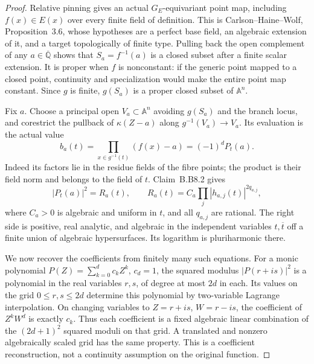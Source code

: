 \begin{proof}
Relative pinning gives an actual $G_E$-equivariant point map,
including $f(x)\in E(x)$ over every finite field of definition.
This is Carlson--Haine--Wolf, Proposition~3.6, whose hypotheses
are a perfect base field, an algebraic extension of it, and a
target topologically of finite type.  Pulling back the open
complement of any $a\in\overline{\mathbb Q}$ shows that
$S_a=f^{-1}(a)$ is a closed subset after a finite scalar extension.
It is proper when $f$ is nonconstant: if the generic point mapped
to a closed point, continuity and specialization would make the
entire point map constant.  Since $g$ is finite, $g(S_a)$ is a
proper closed subset of $\mathbb A^n$.

Fix $a$.  Choose a principal open $V_a\subset\mathbb A^n$
avoiding $g(S_a)$ and the branch locus, and corestrict the pullback
of $\kappa(Z-a)$ along
$g^{-1}(V_a)\to V_a$.  Its evaluation is the actual value
\[
 b_a(t)=\prod_{x\in g^{-1}(t)}(f(x)-a)=(-1)^dP_t(a).
\]
Indeed its factors lie in the residue fields of the fibre points;
the product is their field norm and belongs to the field of $t$.
Claim~B.B8.2 gives
\[
 |P_t(a)|^2=R_a(t),\qquad
 R_a(t)=C_a\prod_j|h_{a,j}(t)|^{2q_{a,j}},                \tag{B.NORM.5}
\]
where $C_a>0$ is algebraic and uniform in $t$, and all $q_{a,j}$
are rational.  The right side is positive, real analytic, and
algebraic in the independent variables $t,\overline t$ off a
finite union of algebraic hypersurfaces.  Its logarithm is
pluriharmonic there.

We now recover the coefficients from finitely many such equations.
For a monic polynomial $P(Z)=\sum_{k=0}^d c_kZ^k$, $c_d=1$,
the squared modulus $|P(r+is)|^2$ is a polynomial in the real
variables $r,s$, of degree at most $2d$ in each.  Its values on
the grid $0\leq r,s\leq2d$ determine this polynomial by
two-variable Lagrange interpolation.  On changing variables to
$Z=r+is$, $W=r-is$, the coefficient of $Z^kW^d$ is exactly
$c_k$.  Thus each coefficient is a fixed algebraic linear
combination of the $(2d+1)^2$ squared moduli on that grid.
A translated and nonzero algebraically scaled grid has the same
property.  This is a coefficient reconstruction, not a continuity
assumption on the original function.


\end{proof}
